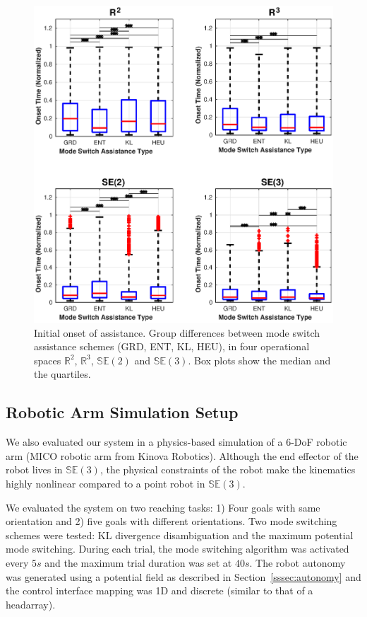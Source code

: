 \documentclass[conference]{IEEEtran}
\begin{document}
 \begin{figure}[t!]
	\centering
	\includegraphics[width= 1.\hsize, height=0.3\vsize, center]{./figures/onset_time.eps}
	\vspace{-0.75cm}
	\caption{Initial onset of assistance. Group differences between mode switch assistance schemes (GRD, ENT, KL, HEU), in four operational spaces $\mathbb{R}^2$, $\mathbb{R}^3$, $\mathbb{SE}(2)$ and $\mathbb{SE}(3)$. Box plots show the median and the quartiles.} 
	\label{fig:initial_alpha}
\end{figure}

\subsection{Robotic Arm	 Simulation Setup}
We also evaluated our system in a physics-based simulation of a 6-DoF robotic arm (MICO robotic arm from Kinova Robotics). Although the end effector of the robot lives in $\mathbb{SE}(3)$, the physical constraints of the robot make the kinematics highly nonlinear compared to a point robot in $\mathbb{SE}(3)$. 

We evaluated the system on two reaching tasks: 1) Four goals with same orientation and 2) five goals with different orientations. Two mode switching schemes were tested: KL divergence disambiguation and the maximum potential mode switching. During each trial, the mode switching algorithm was activated every $5s$ and the maximum trial duration was set at $40s$. The robot autonomy was generated using a potential field as described in Section~\ref{sssec:autonomy} and the control interface mapping was 1D and discrete (similar to that of a headarray).
\end{document}
